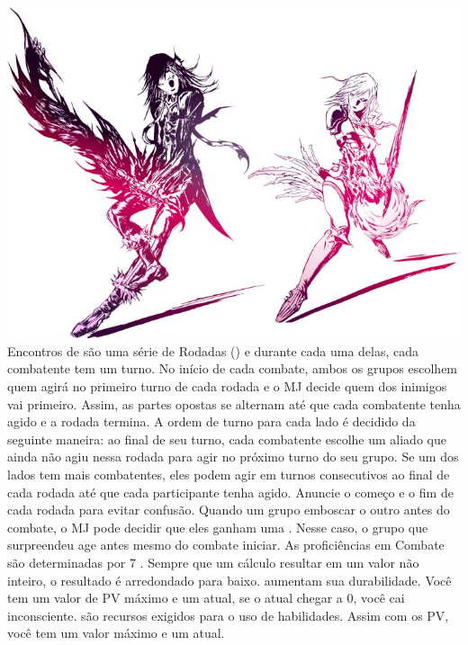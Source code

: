 %
\\
%
\includegraphics[width=\columnwidth]{./art/images/ff13-2.jpg}
%
\vfill
%
Encontros de  são uma série de Rodadas () e durante cada uma delas, cada combatente tem um turno.
No início de cada combate, ambos os grupos escolhem quem agirá no primeiro turno de cada rodada e o MJ decide quem dos inimigos vai primeiro.
Assim, as partes opostas se alternam até que cada combatente tenha agido e a rodada termina. 
A ordem de turno para cada lado é decidido da seguinte maneira: ao final de seu turno, cada combatente escolhe um aliado que ainda não agiu nessa rodada para agir no próximo turno do seu grupo. 
Se um dos lados tem mais combatentes, eles podem agir em turnos consecutivos ao final de cada rodada até que cada participante tenha agido. 
Anuncie o começo e o fim de cada rodada para evitar confusão. Quando um grupo emboscar o outro antes do combate, o MJ pode decidir que eles ganham uma . 
Nesse caso, o grupo que surpreendeu age antes mesmo do combate iniciar.
%
\vfill
%
As proficiências em Combate são determinadas por 7 . 
Sempre que um cálculo resultar em um valor não inteiro, o resultado é arredondado para baixo.
%
\ofgap
%
 aumentam sua durabilidade. Você tem um valor de PV máximo e um atual, se o atual chegar a 0, você cai inconsciente. \ofrow
{} são recursos exigidos para o uso de habilidades. Assim com os PV, você tem um valor máximo e um atual. \ofrow
